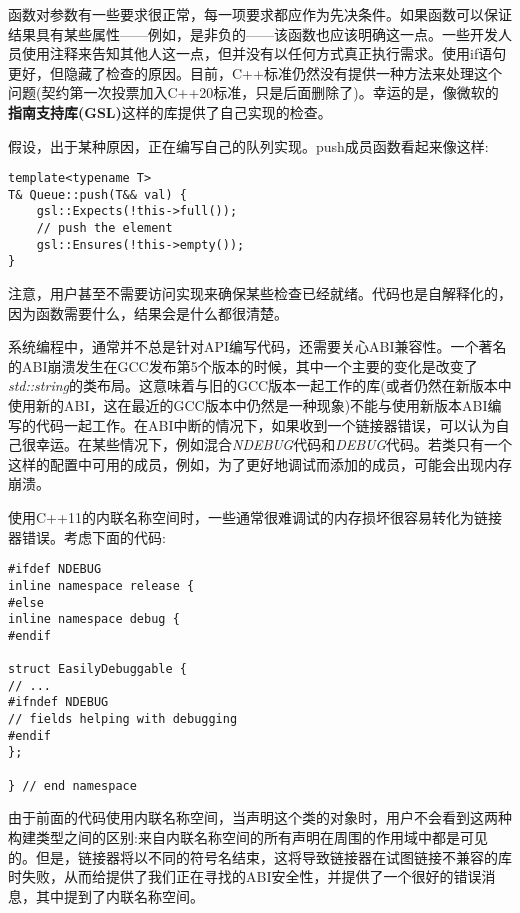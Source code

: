 
函数对参数有一些要求很正常，每一项要求都应作为先决条件。如果函数可以保证结果具有某些属性——例如，是非负的——该函数也应该明确这一点。一些开发人员使用注释来告知其他人这一点，但并没有以任何方式真正执行需求。使用if语句更好，但隐藏了检查的原因。目前，C++标准仍然没有提供一种方法来处理这个问题(契约第一次投票加入C++20标准，只是后面删除了)。幸运的是，像微软的\textbf{指南支持库(GSL)}这样的库提供了自己实现的检查。

假设，出于某种原因，正在编写自己的队列实现。push成员函数看起来像这样:

\begin{lstlisting}[style=styleCXX]
template<typename T>
T& Queue::push(T&& val) {
	gsl::Expects(!this->full());
	// push the element
	gsl::Ensures(!this->empty());
}
\end{lstlisting}

注意，用户甚至不需要访问实现来确保某些检查已经就绪。代码也是自解释化的，因为函数需要什么，结果会是什么都很清楚。


系统编程中，通常并不总是针对API编写代码，还需要关心ABI兼容性。一个著名的ABI崩溃发生在GCC发布第5个版本的时候，其中一个主要的变化是改变了\textit{std::string}的类布局。这意味着与旧的GCC版本一起工作的库(或者仍然在新版本中使用新的ABI，这在最近的GCC版本中仍然是一种现象)不能与使用新版本ABI编写的代码一起工作。在ABI中断的情况下，如果收到一个链接器错误，可以认为自己很幸运。在某些情况下，例如混合\textit{NDEBUG}代码和\textit{DEBUG}代码。若类只有一个这样的配置中可用的成员，例如，为了更好地调试而添加的成员，可能会出现内存崩溃。

使用C++11的内联名称空间时，一些通常很难调试的内存损坏很容易转化为链接器错误。考虑下面的代码:

\begin{lstlisting}[style=styleCXX]
#ifdef NDEBUG
inline namespace release {
#else
inline namespace debug {
#endif

struct EasilyDebuggable {
// ...
#ifndef NDEBUG
// fields helping with debugging
#endif
};

} // end namespace
\end{lstlisting}

由于前面的代码使用内联名称空间，当声明这个类的对象时，用户不会看到这两种构建类型之间的区别:来自内联名称空间的所有声明在周围的作用域中都是可见的。但是，链接器将以不同的符号名结束，这将导致链接器在试图链接不兼容的库时失败，从而给提供了我们正在寻找的ABI安全性，并提供了一个很好的错误消息，其中提到了内联名称空间。

